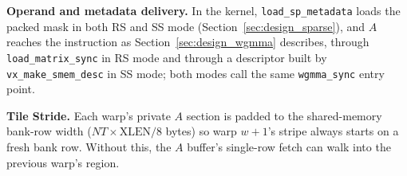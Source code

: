 \textbf{Operand and metadata delivery.} In the kernel, \texttt{load\_sp\_metadata} loads the packed mask in both RS and SS mode (Section~\ref{sec:design_sparse}), and $A$ reaches the instruction as Section~\ref{sec:design_wgmma} describes, through \texttt{load\_matrix\_sync} in RS mode and through a descriptor built by \texttt{vx\_make\_smem\_desc} in SS mode; both modes call the same \texttt{wgmma\_sync} entry point.

\textbf{Tile Stride.} Each warp's private $A$ section is padded to the shared-memory bank-row width ($\mathit{NT}\times\mathrm{XLEN}/8$ bytes) so warp $w{+}1$'s stripe always starts on a fresh bank row. Without this, the $A$ buffer's single-row fetch can walk into the previous warp's region.
